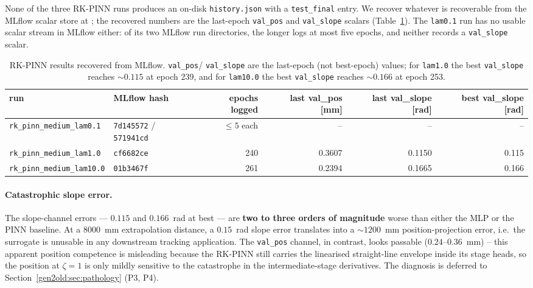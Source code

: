 \documentclass[a4paper,11pt]{article}
\newcommand{\SI}[2]{#1~#2}
\begin{document}
None of the three RK-PINN runs produces an on-disk \texttt{history.json}
with a \texttt{test\_final} entry. We recover whatever is recoverable from
the MLflow scalar store at
; the recovered
numbers are the last-epoch \texttt{val\_pos} and \texttt{val\_slope} scalars
(Table~\ref{gen2old:tab:rkpinn_res}). The \texttt{lam0.1} run has no usable
scalar stream in MLflow either: of its two MLflow run directories, the
longer logs at most five epochs, and neither records a
\texttt{val\_slope} scalar.

\begin{table}[h]
\centering\small
\caption{RK-PINN results recovered from MLflow. \texttt{val\_pos}/
\texttt{val\_slope} are the last-epoch (not best-epoch) values; for
\texttt{lam1.0} the best \texttt{val\_slope} reaches $\sim\!0.115$
at epoch 239, and for \texttt{lam10.0} the best
\texttt{val\_slope} reaches $\sim\!0.166$ at epoch 253.}
\label{gen2old:tab:rkpinn_res}
\begin{tabular}{llrrrr}
\toprule
run & MLflow hash & epochs logged
    & last val\_pos [mm] & last val\_slope [rad] & best val\_slope [rad]\\
\midrule
\texttt{rk\_pinn\_medium\_lam0.1}  & \texttt{7d145572} / \texttt{571941cd} & $\le 5$ each & --     & --     & --\\
\texttt{rk\_pinn\_medium\_lam1.0}  & \texttt{cf6682ce}                     & 240          & 0.3607 & 0.1150 & 0.115\\
\texttt{rk\_pinn\_medium\_lam10.0} & \texttt{01b3467f}                     & 261          & 0.2394 & 0.1665 & 0.166\\
\bottomrule
\end{tabular}
\end{table}

\paragraph{Catastrophic slope error.}
The slope-channel errors --- $0.115$ and $0.166$~rad at best --- are
\textbf{two to three orders of magnitude} worse than either the MLP or the
PINN baseline. At a \SI{8000}{mm} extrapolation distance, a $0.15$~rad slope
error translates into a $\sim\!1200$~mm position-projection error, i.e.\ the
surrogate is unusable in any downstream tracking application. The
\texttt{val\_pos} channel, in contrast, looks passable ($0.24$--$0.36$~mm) --
this apparent position competence is misleading because the RK-PINN still
carries the linearised straight-line envelope inside its stage heads, so the
position at $\zeta=1$ is only mildly sensitive to the catastrophe in the
intermediate-stage derivatives. The diagnosis is deferred to
Section~\ref{gen2old:sec:pathology} (P3, P4).
\end{document}
